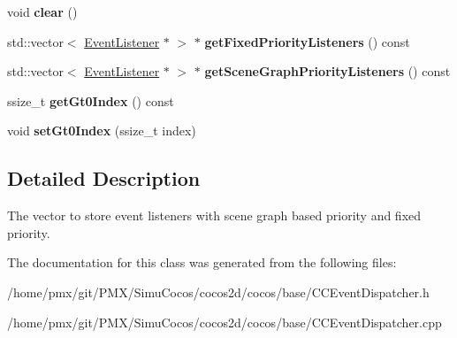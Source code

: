\begin{DoxyCompactItemize}
void {\bfseries clear} ()
\item 
\mbox{\label{classEventDispatcher_1_1EventListenerVector_aad9bba722383f5441e7ba9ec59582625}} 
std\+::vector$<$ \hyperlink{classEventListener}{Event\+Listener} $\ast$ $>$ $\ast$ {\bfseries get\+Fixed\+Priority\+Listeners} () const
\item 
\mbox{\label{classEventDispatcher_1_1EventListenerVector_a1ae71a8f414ac4cb179126b8df34841c}} 
std\+::vector$<$ \hyperlink{classEventListener}{Event\+Listener} $\ast$ $>$ $\ast$ {\bfseries get\+Scene\+Graph\+Priority\+Listeners} () const
\item 
\mbox{\label{classEventDispatcher_1_1EventListenerVector_a2de97d574940a3049755af49be125c4a}} 
ssize\+\_\+t {\bfseries get\+Gt0\+Index} () const
\item 
\mbox{\label{classEventDispatcher_1_1EventListenerVector_a30edf81549b8d6968485ce9c9ac6da0a}} 
void {\bfseries set\+Gt0\+Index} (ssize\+\_\+t index)
\end{DoxyCompactItemize}


\subsection{Detailed Description}
The vector to store event listeners with scene graph based priority and fixed priority. 

The documentation for this class was generated from the following files\+:\begin{DoxyCompactItemize}
\item 
/home/pmx/git/\+P\+M\+X/\+Simu\+Cocos/cocos2d/cocos/base/C\+C\+Event\+Dispatcher.\+h\item 
/home/pmx/git/\+P\+M\+X/\+Simu\+Cocos/cocos2d/cocos/base/C\+C\+Event\+Dispatcher.\+cpp\end{DoxyCompactItemize}
